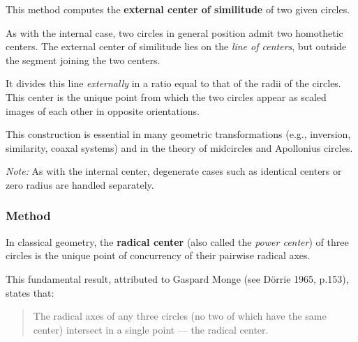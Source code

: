 This method computes the \textbf{external center of similitude} of two given circles.

\medskip
\noindent
As with the internal case, two circles in general position admit two homothetic centers. The external center of similitude lies on the \emph{line of centers}, but outside the segment joining the two centers.

\medskip
\noindent
It divides this line \emph{externally} in a ratio equal to that of the radii of the circles. This center is the unique point from which the two circles appear as scaled images of each other in opposite orientations.

\medskip
\noindent
This construction is essential in many geometric transformations (e.g., inversion, similarity, coaxal systems) and in the theory of midcircles and Apollonius circles.

\medskip
\noindent
\emph{Note:} As with the internal center, degenerate cases such as identical centers or zero radius are handled separately.

\vspace{1em}

\begin{tkzexample}[latex=.5\textwidth]
\begin{center}
\end{center}
\end{tkzexample}

\subsubsection{Method }
\label{ssub:radical_center}

In classical geometry, the \textbf{radical center} (also called the \emph{power center}) of three circles is the unique point of concurrency of their pairwise radical axes.

\medskip
\noindent
This fundamental result, attributed to Gaspard Monge (see Dörrie 1965, p.153), states that:
\begin{quote}
The radical axes of any three circles (no two of which have the same center) intersect in a single point — the radical center.
\end{quote}

